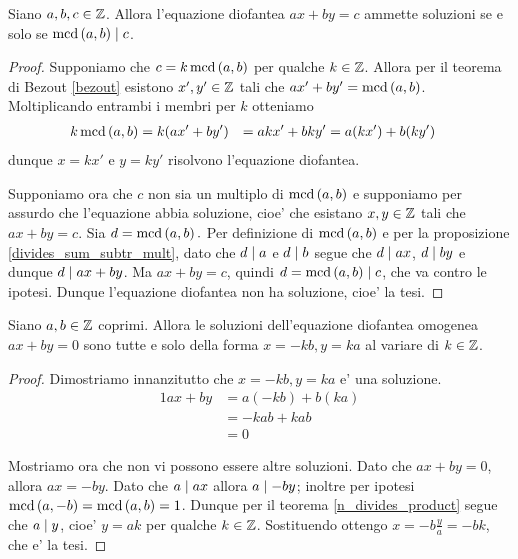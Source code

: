 \begin{theorem}
    Siano $a, b, c \in \mathbb{Z}$. Allora l'equazione diofantea $ax + by = c$ ammette soluzioni
    se e solo se $\operatorname{mcd}\left(a, b\right) \mid c$.
\end{theorem}
\begin{proof}
    Supponiamo che $c = k\operatorname{mcd}\left(a, b\right)$ per qualche $k \in \mathbb{Z}$. Allora per il teorema di Bezout
    \ref{bezout} esistono $x', y' \in \mathbb{Z}$ tali che $ax' + by' = \operatorname{mcd}\left(a, b\right)$. Moltiplicando
    entrambi i membri per $k$ otteniamo
    \begin{alignat*}{2} 
        k\operatorname{mcd}\left(a, b\right) &= k(ax' + by')
                    &= akx' + bky'
                    &= a(kx') + b(ky')
    \end{alignat*}
    dunque $x = kx'$ e $y = ky'$ risolvono l'equazione diofantea.

    Supponiamo ora che $c$ non sia un multiplo di $\operatorname{mcd}\left(a, b\right)$ e supponiamo per assurdo che l'equazione
    abbia soluzione, cioe' che esistano $x, y \in \mathbb{Z}$ tali che $ax + by = c$. Sia $d = \operatorname{mcd}\left(a, b\right).$
    Per definizione di $\operatorname{mcd}\left(a, b\right)$ e per la proposizione \ref{divides_sum_subtr_mult},
    dato che $d \mid a$ e $d \mid b$ segue che $d \mid ax$, $d \mid by$ e dunque
    $d \mid ax + by$. Ma $ax + by = c$, quindi $d = \operatorname{mcd}\left(a, b\right) \mid c$, che va contro le ipotesi.
    Dunque l'equazione diofantea non ha soluzione, cioe' la tesi.
\end{proof}

\begin{theorem} \label{sol_diofantea_omogenea_coprimi}
    Siano $a, b \in \mathbb{Z}$ coprimi. Allora le soluzioni dell'equazione diofantea omogenea $ax + by = 0$ 
    sono tutte e solo della forma $x = -kb, y = ka$ al variare di $k \in \mathbb{Z}$.
\end{theorem}
\begin{proof}
    Dimostriamo innanzitutto che $x = -kb, y = ka$ e' una soluzione.
    \begin{alignat*}{1}
        ax + by &= a(-kb) + b(ka)\\
                &= -kab + kab\\
                &= 0
    \end{alignat*}

    Mostriamo ora che non vi possono essere altre soluzioni. Dato che $ax + by = 0$, allora $ax = -by$.
    Dato che $a \mid ax$ allora $a \mid -by$; inoltre per ipotesi $\operatorname{mcd}\left(a, -b\right) = \operatorname{mcd}\left(a, b\right) = 1$.
    Dunque per il teorema \ref{n_divides_product} segue che $a \mid y$, cioe' $y = ak$ per
    qualche $k \in \mathbb{Z}$. Sostituendo ottengo $x = -b\frac{y}{a} = -bk$, che e' la tesi.
\end{proof}


